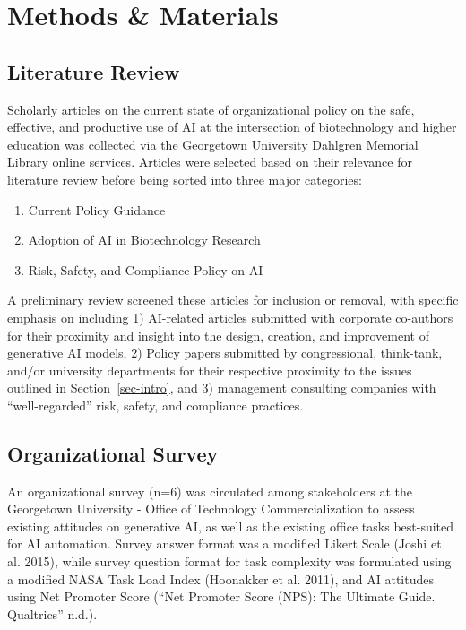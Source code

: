\documentclass[
]{article}
\providecommand{\tightlist}{%
  \setlength{\itemsep}{0pt}\setlength{\parskip}{0pt}}\usepackage{longtable,booktabs,array}
\begin{document}
\section{Methods \& Materials}\label{methods-materials-1}

\subsection{Literature Review}\label{literature-review-1}

Scholarly articles on the current state of organizational policy on the
safe, effective, and productive use of AI at the intersection of
biotechnology and higher education was collected via the Georgetown
University Dahlgren Memorial Library online services. Articles were
selected based on their relevance for literature review before being
sorted into three major categories:

\begin{enumerate}
\def\labelenumi{\arabic{enumi}.}
\tightlist
\item
  Current Policy Guidance
\item
  Adoption of AI in Biotechnology Research
\item
  Risk, Safety, and Compliance Policy on AI
\end{enumerate}

A preliminary review screened these articles for inclusion or removal,
with specific emphasis on including 1) AI-related articles submitted
with corporate co-authors for their proximity and insight into the
design, creation, and improvement of generative AI models, 2) Policy
papers submitted by congressional, think-tank, and/or university
departments for their respective proximity to the issues outlined in
Section~\ref{sec-intro}, and 3) management consulting companies with
``well-regarded'' risk, safety, and compliance practices.

\subsection{Organizational Survey}\label{organizational-survey-1}

An organizational survey (n=6) was circulated among stakeholders at the
Georgetown University - Office of Technology Commercialization to assess
existing attitudes on generative AI, as well as the existing office
tasks best-suited for AI automation. Survey answer format was a modified
Likert Scale (Joshi et al. 2015), while survey question format for task
complexity was formulated using a modified NASA Task Load Index
(Hoonakker et al. 2011), and AI attitudes using Net Promoter Score
({``Net Promoter Score ({NPS}): The Ultimate Guide. Qualtrics''} n.d.).
\end{document}
